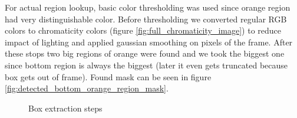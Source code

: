 \documentclass{article}
\begin{document}
For actual region lookup, basic color thresholding was used
since orange region had very distinguishable color. Before 
thresholding we converted regular RGB colors
to chromaticity colors (figure \ref{fig:full_chromaticity_image}) to reduce impact of lighting
and applied gaussian smoothing on pixels of
the frame. After these stops two big regions of
orange were found and we took the biggest one
since bottom region is always the biggest (later it 
even gets truncated because box gets out of frame).
Found mask can be seen in figure \ref{fig:detected_bottom_orange_region_mask}.

\begin{figure}[h!]
    \centering
      \quad
      \caption{Box extraction steps}
\end{figure}
\end{document}
